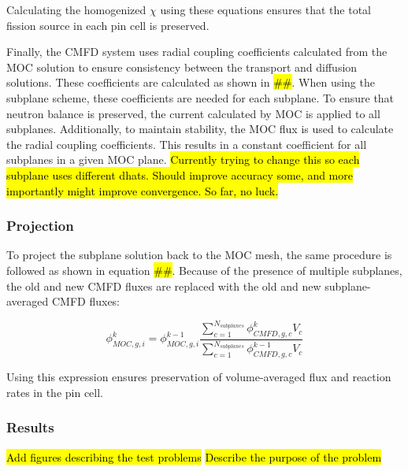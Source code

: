 Calculating the homogenized $\chi$ using these equations ensures that the total fission source in each pin cell is preserved.

Finally, the CMFD system uses radial coupling coefficients calculated from the MOC solution to ensure consistency between the transport and diffusion solutions.  These coefficients are calculated as shown in \hl{\#\#}.  When using the subplane scheme, these coefficients are needed for each subplane.  To ensure that neutron balance is preserved, the current calculated by MOC is applied to all subplanes.  Additionally, to maintain stability, the MOC flux is used to calculate the radial coupling coefficients.  This results in a constant coefficient for all subplanes in a given MOC plane.  \hl{Currently trying to change this so each subplane uses different dhats.  Should improve accuracy some, and more importantly might improve convergence.  So far, no luck.}

\subsubsection{Projection}

To project the subplane solution back to the MOC mesh, the same procedure is followed as shown in equation \hl{\#\#}.  Because of the presence of multiple subplanes, the old and new CMFD fluxes are replaced with the old and new subplane-averaged CMFD fluxes:

\begin{equation}
\phi_{MOC,g,i}^k = \phi_{MOC,g,i}^{k-1} \frac{\sum_{c=1}^{N_{subplanes}} \phi_{CMFD,g,c}^k V_c}{\sum_{c=1}^{N_{subplanes}} \phi_{CMFD,g,c}^{k-1} V_c}
\end{equation}

Using this expression ensures preservation of volume-averaged flux and reaction rates in the pin cell.

\subsubsection{Results}

\hl{Add figures describing the test problems}
\hl{Describe the purpose of the problem}

